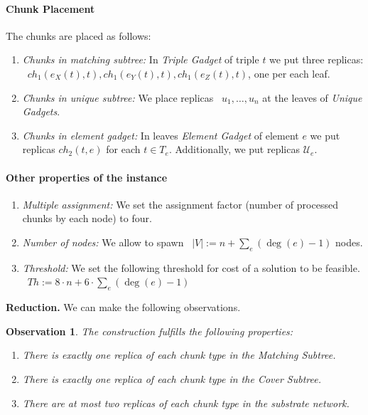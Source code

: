 \documentclass[preprint,12pt]{elsarticle}
\newcommand{\numNodes}{\ensuremath{|V|}}
\newcommand{\MatchSubtree}{{\emph{Matching Subtree}}}
\newcommand{\CoverSubtree}{{\emph{Cover Subtree}}}
\newcommand{\TripleGadget}{{\emph{Triple Gadget}}}
\newcommand{\UnqGadgets}{{\emph{Unique Gadgets}}}
\newcommand{\ElGadget}{{\emph{Element Gadget}}}
\newcommand{\UniqueE}{{\ensuremath{\mathcal{U}_e}}}
\newtheorem{obs}{Observation}
\newcommand{\Thr}{\ensuremath{Th}}
\begin{document}
\paragraph{Chunk Placement}
The chunks are placed as follows:
\begin{enumerate}
  \item \emph{Chunks in matching subtree:} In {\TripleGadget} of triple $t$ we put
  three replicas:
 ~$ch_1(e_X(t), t), ch_1(e_Y(t), t), ch_1(e_Z(t), t)$, one per each leaf.
  \item \emph{Chunks in unique subtree:} We place replicas
 ~$u_1,\ldots, u_n$ at the leaves of \UnqGadgets.
 \item \emph{Chunks in element gadget:} In leaves {\ElGadget} of element $e$ we put replicas $ch_2(t, e)$ for each $t \in T_e$. Additionally, we put replicas $\UniqueE$.
\end{enumerate}

\paragraph{Other properties of the instance}
\begin{enumerate}
  \item \emph{Multiple assignment:} We set the assignment factor (number of processed
  chunks by each node) to four.
  \item \emph{Number of nodes:} We allow to spawn
 ~$\numNodes := n + \sum_{e}(\deg(e)-1)$ nodes.
  \item \emph{Threshold:} We set the following threshold for cost of a solution to be feasible.
 ~$\Thr := 8\cdot n + 6\cdot\sum_{e}(\deg(e)-1)$
\end{enumerate}


\textbf{Reduction.}  We can make the following observations.

\begin{obs}
  The construction fulfills the following properties:
  \begin{enumerate}
    \item There is exactly one replica of each chunk type in the
    \MatchSubtree.

    \item There is exactly one replica of each chunk type in the
    \CoverSubtree.

    \item There are at most two replicas of each chunk type in the
    substrate network.
  \end{enumerate}
\end{obs}
\end{document}

